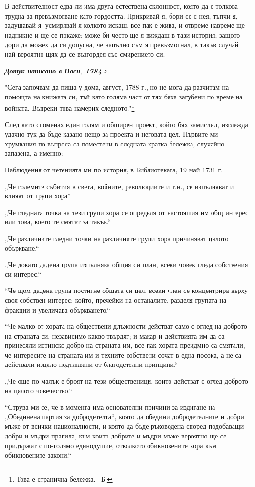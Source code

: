 \documentclass[12pt]{book}
\begin{document}
В действителност едва ли има друга естествена склонност, която да е толкова трудна за превъзмогване като гордостта. Прикривай я, бори се с нея, тъпчи я, задушавай я, усмирявай я колкото искаш, все пак е жива, и отвреме навреме ще надникне и ще се покаже; може би често ще я виждаш в тази история; защото дори да можех да си допусна, че напълно съм я превъзмогнал, в такъв случай най-вероятно щях да се възгордея със смирението си.

\textit{\textbf{Дотук написано в Паси, 1784 г.}}


"Сега започвам да пиша у дома, август, 1788 г., но не мога да разчитам на помощта на книжата си, тъй като голяма част от тях бяха загубени по време на войната. Въпреки това намерих следното."\footnote{Това е странична бележка. --Б.}

След като споменах един голям и обширен проект, който бях замислил, изглежда удачно тук да бъде казано нещо за проекта и неговата цел. Първите ми хрумвания по въпроса са поместени в следната кратка бележка, случайно запазена, а именно:

Наблюдения от четенията ми по история, в Библиотеката, 19 май 1731 г.

„Че големите събития в света, войните, революциите и т.н., се изпълняват и влияят от групи хора”

„Че гледната точка на тези групи хора се определя от настоящия им общ интерес или това, което те смятат за такъв.“

„Че различните гледни точки на различните групи хора причиняват цялото объркване.“

„Че докато дадена група изпълнява общия си план, всеки човек гледа собствения си интерес.“

“Че щом дадена група постигне общата си цел, всеки член се концентрира върху своя собствен интерес; който, пречейки на останалите, разделя групата на фракции и увеличава объркването.“

“Че малко от хората на обществени длъжности действат само с оглед на доброто на страната си, независимо какво твърдят; и макар и действията им да са принесяли истинско добро на страната им, все пак хората преидмно са смятали, че интересите на страната им и техните собствени сочат в една посока, а не са действали изцяло подтиквани от благодетелни принципи.“

„Че още по-малък е броят на тези общественици, които действат с оглед доброто на цялото човечество.“

“Струва ми се, че в момента има основателни причини за издигане на „Обединена партия за добродетелта“, която да обедини добродетелните и добри мъже от всички националности, и която да бъде ръководена според подобаващи добри и мъдри правила, към които добрите и мъдри мъже вероятно ще се придържат с по-голямо единодушие, отколкото обикновените хора към обикновените закони.“
\end{document}
